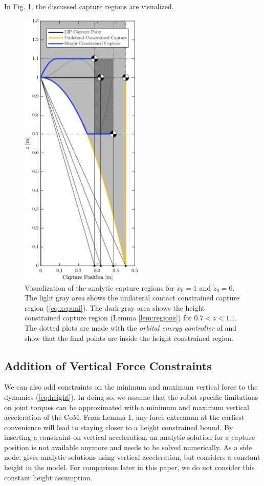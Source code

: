 \documentclass[letterpaper, 10 pt, conference]{ieeeconf}  %
\begin{document}
In Fig. \ref{fig:capregion}, the discussed capture regions are visualized.
\begin{figure}
      \centering
      \includegraphics[width=2.3in]{CPLimitsDark.png}
      \caption{Visualization of the analytic capture regions for $\dot{x}_0=1$ and $\dot{z}_0=0$. The light gray area shows the unilateral contact constrained capture region (\ref{eq:xcpuni}). The dark gray area shows the height constrained capture region (Lemma \ref{lem:regionz})  for $0.7<z<1.1$. The dotted plots are made with the \textit{orbital energy controller} of \cite{koolen2016balance} and show that the final points are inside the height constrained region.}
      \label{fig:capregion}
\end{figure}

\subsection{Addition of Vertical Force Constraints}\label{forcecapture}
We can also add constraints on the minimum and maximum vertical force to the dynamics (\ref{eq:height}). In doing so, we assume that the robot specific limitations on joint torques can be approximated with a minimum and maximum vertical acceleration of the CoM. From Lemma 1, any force extremum at the earliest convenience will lead to staying closer to a height constrained bound. By inserting a constraint on vertical acceleration, an analytic solution for a capture position is not available anymore and needs to be solved numerically. As a side node, \cite{gao2017increase} gives analytic solutions using vertical acceleration, but considers a constant height in the model. For comparison later in this paper, we do not consider this constant height assumption.
\end{document}
